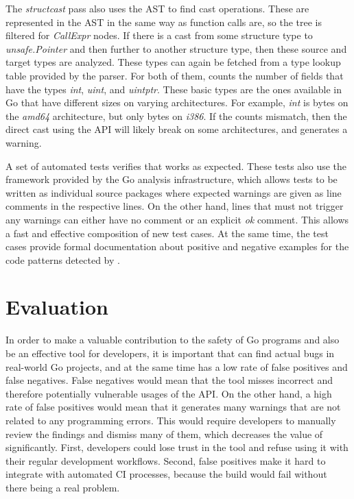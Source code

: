 The \textit{structcast} pass also uses the \acrshort{AST} to find cast operations.
These are represented in the \acrshort{AST} in the same way as function calls are, so the tree is filtered for
\textit{CallExpr} nodes.
If there is a cast from some structure type to \textit{unsafe.Pointer} and then further to another structure type, then
these source and target types are analyzed.
These types can again be fetched from a type lookup table provided by the parser.
For both of them, \toolSafer{} counts the number of fields that have the types \textit{int}, \textit{uint}, and
\textit{uintptr}.
These  basic types are the ones available in Go that have different sizes on varying architectures.
For example, \textit{int} is  bytes on the \textit{amd64} architecture, but only  bytes
on \textit{i386}.
If the counts mismatch, then the direct cast using the \unsafe{} \acrshort{API} will likely break on some architectures,
and \toolSafer{} generates a warning.

A set of automated tests verifies that \toolSafer{} works as expected.
These tests also use the framework provided by the Go analysis infrastructure, which allows tests to be written as
individual source packages where expected warnings are given as line comments in the respective lines.
On the other hand, lines that must not trigger any warnings can either have no comment or an explicit \textit{ok}
comment.
This allows a fast and effective composition of new test cases.
At the same time, the test cases provide formal documentation about positive and negative examples for the code patterns
detected by \toolSafer{}.



\section{Evaluation}\label{sec:go-safer:evaluation}

In order to make a valuable contribution to the safety of Go programs and also be an effective tool for developers, it
is important that \toolSafer{} can find actual bugs in real-world Go projects, and at the same time has a low rate of
false positives and false negatives.
False negatives would mean that the tool misses incorrect and therefore potentially vulnerable usages of the \unsafe{}
\acrshort{API}.
On the other hand, a high rate of false positives would mean that it generates many warnings that are not related to
any programming errors.
This would require developers to manually review the findings and dismiss many of them, which decreases the value of
\toolSafer{} significantly.
First, developers could lose trust in the tool and refuse using it with their regular development workflows.
Second, false positives make it hard to integrate \toolSafer{} with automated \acrshort{CI} processes, because the build
would fail without there being a real problem.

